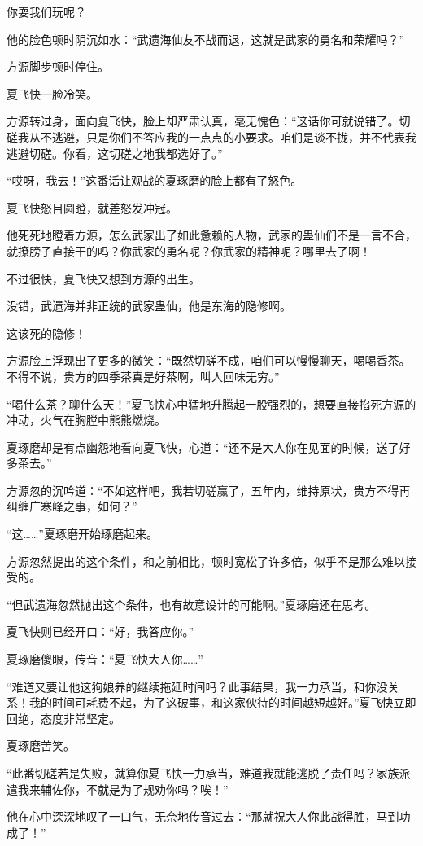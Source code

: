 \begin{this_body}
你耍我们玩呢？

他的脸色顿时阴沉如水：“武遗海仙友不战而退，这就是武家的勇名和荣耀吗？”

方源脚步顿时停住。

夏飞快一脸冷笑。

方源转过身，面向夏飞快，脸上却严肃认真，毫无愧色：“这话你可就说错了。切磋我从不逃避，只是你们不答应我的一点点的小要求。咱们是谈不拢，并不代表我逃避切磋。你看，这切磋之地我都选好了。”

“哎呀，我去！”这番话让观战的夏琢磨的脸上都有了怒色。

夏飞快怒目圆瞪，就差怒发冲冠。

他死死地瞪着方源，怎么武家出了如此惫赖的人物，武家的蛊仙们不是一言不合，就撩膀子直接干的吗？你武家的勇名呢？你武家的精神呢？哪里去了啊！

不过很快，夏飞快又想到方源的出生。

没错，武遗海并非正统的武家蛊仙，他是东海的隐修啊。

这该死的隐修！

方源脸上浮现出了更多的微笑：“既然切磋不成，咱们可以慢慢聊天，喝喝香茶。不得不说，贵方的四季茶真是好茶啊，叫人回味无穷。”

“喝什么茶？聊什么天！”夏飞快心中猛地升腾起一股强烈的，想要直接掐死方源的冲动，火气在胸膛中熊熊燃烧。

夏琢磨却是有点幽怨地看向夏飞快，心道：“还不是大人你在见面的时候，送了好多茶去。”

方源忽的沉吟道：“不如这样吧，我若切磋赢了，五年内，维持原状，贵方不得再纠缠广寒峰之事，如何？”

“这……”夏琢磨开始琢磨起来。

方源忽然提出的这个条件，和之前相比，顿时宽松了许多倍，似乎不是那么难以接受的。

“但武遗海忽然抛出这个条件，也有故意设计的可能啊。”夏琢磨还在思考。

夏飞快则已经开口：“好，我答应你。”

夏琢磨傻眼，传音：“夏飞快大人你……”

“难道又要让他这狗娘养的继续拖延时间吗？此事结果，我一力承当，和你没关系！我的时间可耗费不起，为了这破事，和这家伙待的时间越短越好。”夏飞快立即回绝，态度非常坚定。

夏琢磨苦笑。

“此番切磋若是失败，就算你夏飞快一力承当，难道我就能逃脱了责任吗？家族派遣我来辅佐你，不就是为了规劝你吗？唉！”

他在心中深深地叹了一口气，无奈地传音过去：“那就祝大人你此战得胜，马到功成了！”


\end{this_body}
